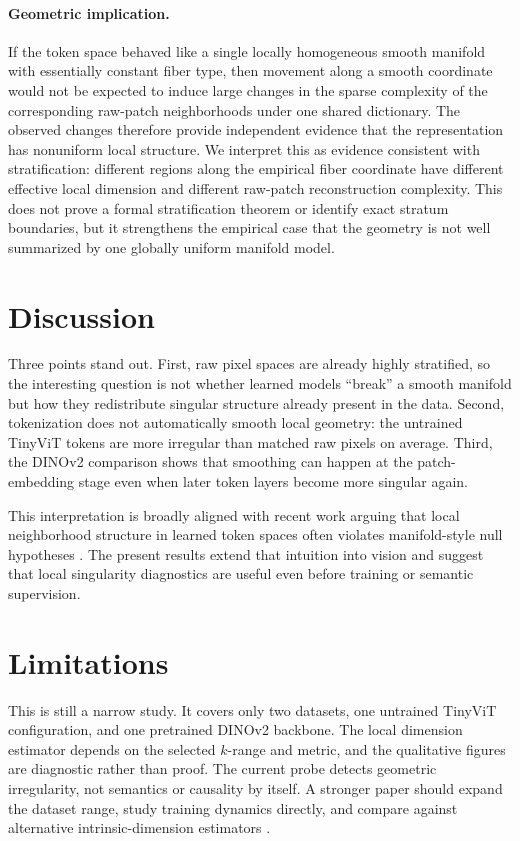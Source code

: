 \documentclass{article}
\begin{document}
\paragraph{Geometric implication.}
If the token space behaved like a single locally homogeneous smooth manifold with essentially constant fiber type, then movement along a smooth coordinate would not be expected to induce large changes in the sparse complexity of the corresponding raw-patch neighborhoods under one shared dictionary. The observed changes therefore provide independent evidence that the representation has nonuniform local structure. We interpret this as evidence consistent with stratification: different regions along the empirical fiber coordinate have different effective local dimension and different raw-patch reconstruction complexity. This does not prove a formal stratification theorem or identify exact stratum boundaries, but it strengthens the empirical case that the geometry is not well summarized by one globally uniform manifold model.

\section{Discussion}
Three points stand out. First, raw pixel spaces are already highly stratified, so the interesting question is not whether learned models ``break'' a smooth manifold but how they redistribute singular structure already present in the data. Second, tokenization does not automatically smooth local geometry: the untrained TinyViT tokens are more irregular than matched raw pixels on average. Third, the DINOv2 comparison shows that smoothing can happen at the patch-embedding stage even when later token layers become more singular again.

This interpretation is broadly aligned with recent work arguing that local neighborhood structure in learned token spaces often violates manifold-style null hypotheses \citep{robinson2025token}. The present results extend that intuition into vision and suggest that local singularity diagnostics are useful even before training or semantic supervision.

\section{Limitations}
This is still a narrow study. It covers only two datasets, one untrained TinyViT configuration, and one pretrained DINOv2 backbone. The local dimension estimator depends on the selected $k$-range and metric, and the qualitative figures are diagnostic rather than proof. The current probe detects geometric irregularity, not semantics or causality by itself. A stronger paper should expand the dataset range, study training dynamics directly, and compare against alternative intrinsic-dimension estimators \citep{facco2017estimating}.
\end{document}
